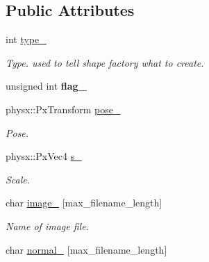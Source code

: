 \subsection*{\-Public \-Attributes}
\begin{DoxyCompactItemize}
\item 
\hypertarget{classglutpp_1_1shape_1_1Raw_afdf8cef82798f62db8e15cb00cb2231f}{int \hyperlink{classglutpp_1_1shape_1_1Raw_afdf8cef82798f62db8e15cb00cb2231f}{type\-\_\-}}\label{classglutpp_1_1shape_1_1Raw_afdf8cef82798f62db8e15cb00cb2231f}

\begin{DoxyCompactList}\small\item\em \-Type. used to tell shape factory what to create. \end{DoxyCompactList}\item 
\hypertarget{classglutpp_1_1shape_1_1Raw_ac37dc7dd76de96f21b0b26991e52bcd0}{unsigned int {\bfseries flag\-\_\-}}\label{classglutpp_1_1shape_1_1Raw_ac37dc7dd76de96f21b0b26991e52bcd0}

\item 
\hypertarget{classglutpp_1_1shape_1_1Raw_a7e2d6557c9c3b2e14e492abe2a501af5}{physx\-::\-Px\-Transform \hyperlink{classglutpp_1_1shape_1_1Raw_a7e2d6557c9c3b2e14e492abe2a501af5}{pose\-\_\-}}\label{classglutpp_1_1shape_1_1Raw_a7e2d6557c9c3b2e14e492abe2a501af5}

\begin{DoxyCompactList}\small\item\em \-Pose. \end{DoxyCompactList}\item 
\hypertarget{classglutpp_1_1shape_1_1Raw_ad4035488a8231142f54f67437484f1cc}{physx\-::\-Px\-Vec4 \hyperlink{classglutpp_1_1shape_1_1Raw_ad4035488a8231142f54f67437484f1cc}{s\-\_\-}}\label{classglutpp_1_1shape_1_1Raw_ad4035488a8231142f54f67437484f1cc}

\begin{DoxyCompactList}\small\item\em \-Scale. \end{DoxyCompactList}\item 
\hypertarget{classglutpp_1_1shape_1_1Raw_a4f750dd9582a40cbe80d8e3f8caeaef5}{char \hyperlink{classglutpp_1_1shape_1_1Raw_a4f750dd9582a40cbe80d8e3f8caeaef5}{image\-\_\-} \mbox{[}max\-\_\-filename\-\_\-length\mbox{]}}\label{classglutpp_1_1shape_1_1Raw_a4f750dd9582a40cbe80d8e3f8caeaef5}

\begin{DoxyCompactList}\small\item\em \-Name of image file. \end{DoxyCompactList}\item 
\hypertarget{classglutpp_1_1shape_1_1Raw_a3ce7c4b00ca96af53ab5168dd105322b}{char \hyperlink{classglutpp_1_1shape_1_1Raw_a3ce7c4b00ca96af53ab5168dd105322b}{normal\-\_\-} \mbox{[}max\-\_\-filename\-\_\-length\mbox{]}}\label{classglutpp_1_1shape_1_1Raw_a3ce7c4b00ca96af53ab5168dd105322b}


\end{DoxyCompactItemize}
